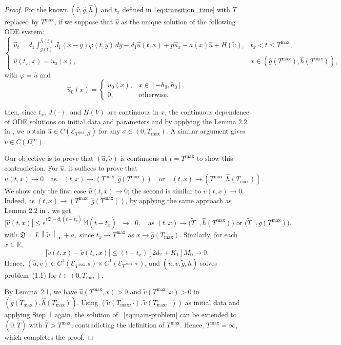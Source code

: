 \documentclass[a4paper,11pt]{amsart}
\theoremstyle{definition}
\numberwithin{equation}{section}
\theoremstyle{definition}
\begin{document}
\begin{proof}
\smallskip
For the known $(\hat{v}, \hat{g}, \hat{h})$ and $t_x$ defined in~\eqref{eq:transition_time} with $T$ replaced by $T^{\max}$, if we suppose that $\hat{u}$ as the unique solution of the following ODE system:
\[
\begin{cases}
\hat{u}_t = d_1 \displaystyle\int_{\hat{g}(t)}^{\hat{h}(t)} J_1(x-y) \varphi(t,y) \, dy
- d_1 \hat{u}(t,x) +  p \hat{u}_x - a(x) \hat{u} + H( \tilde{v}), & t_x < t \leq T^{\max}, \\
\hat{u}(t_x, x) = \tilde{u}_0(x), & x \in (\hat{g}(T^{\max}), \hat{h}(T^{\max})),
\end{cases}
\]
with $\varphi = \hat{u}$ and
\[
\hat{u}_0(x) =
\begin{cases}
u_0(x), & x \in [-h_0, h_0], \\
0, & \text{otherwise},
\end{cases}
\]

then, since $t_x$, $J(\cdot)$, and $H(V)$ are continuous in $x$, the continuous dependence of ODE solutions on initial data and parameters and by applying the Lemma $2.2$ in \cite{Tang2024a}, we obtain  $\hat{u} \in C(\mathcal{E}_{T^{\max}, B})$ for any $\sigma \in (0, T_{\max})$.
A similar argument gives $\tilde{v} \in C(\Omega^{\infty}_s)$.

\smallskip
Our objective is to prove that $(\hat{u}, \tilde{v})$ is continuous at $t = T^{\max}$  to show this contradiction.
For $\hat{u}$, it suffices to prove that
\[
\hat{u}(t,x) \to 0
\quad \text{as} \quad (t,x) \to (T^{\max}, \hat{g}(T^{\max}))
\quad \text{or} \quad (t,x) \to (T^{\max}, \hat{h}(T_{\max})).
\]
We show only the first case $\hat{u}(t,x) \to 0 $; the second is similar to $\tilde{v}(t,x) \to 0$.
Indeed, as $(t,x) \to (T^{\max}, \hat{g}(T^{\max}))$, by applying the same approach as  Lemma 2.2 in \cite{Tang2024a},  we get
\[
|\hat{u}(t,x)| \leq e^{(\mathfrak{D}-d_1 (t-\tilde{t}_x)} \, \mathbb{M}(t-\tilde{t}_x) \;\;\longrightarrow\;\; 0,
\quad \text{as } (t,x) \to \big(\tilde{T}^{-}, \hat{h}(T^{\max})\big) \text{ or } \big(\tilde{T}^{-}, g(T^{\max})\big).
\]
with  $\mathfrak{D}= L \left\|\tilde{v}\right\|_\infty +\underline{a},$
since $t_x \to T^{\max}$ as $x \to \hat{g}(T_{\max})$.
Similarly, for each $x \in \mathbb{R}$,
\[
|\tilde{v}(t,x) - \tilde{v}(t_x, x)| \leq (t - t_x) [2d_2 + K_1] M_0 \to 0.
\]
Hence, $(\hat{u}, \tilde{v}) \in C^1(\mathcal{E}_{T^{\max, B}}) \times C^1(\mathcal{E}_{T^{\max, \infty}})$,
and $(\tilde{u}, \tilde{v}, \tilde{g}, \tilde{h})$ solves problem~(1.1) for $t \in (0, T_{\max})$.

\smallskip
By Lemma~2.1, we have
$\hat{u}(T^{\max}, x) > 0$ and $\tilde{v}(T^{\max}, x) > 0$ in $(\hat{g}(T_{\max}), \hat{h}(T_{\max}))$.
Using $(\tilde{u}(T_{\max}, \cdot), \tilde{v}(T_{\max}, \cdot))$ as initial data and applying Step~1 again,
the solution of~ \eqref{eq:main-problem} can be extended to $(0, \hat{T})$ with $\hat{T} > T^{\max}$,
contradicting the definition of $T^{\max}$.
Hence, $T^{\max} = \infty$, which completes the proof.
\end{proof}
\end{document}
